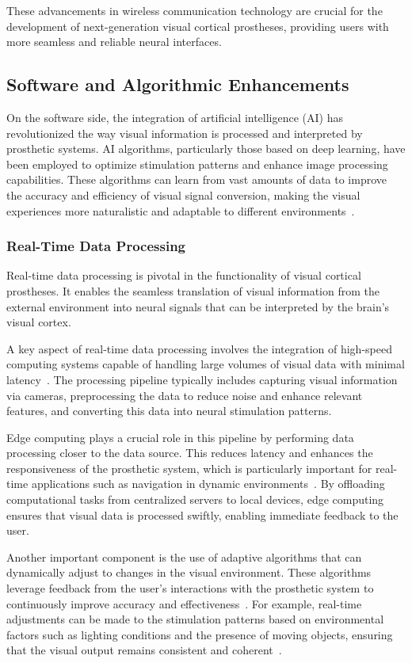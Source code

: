 \documentclass[twocolumn,10pt]{article}
\begin{document}
These advancements in wireless communication technology are crucial for the
development of next-generation visual cortical prostheses, providing users with
more seamless and reliable neural interfaces.

\subsection{Software and Algorithmic Enhancements}
On the software side, the integration of artificial intelligence (AI) has
revolutionized the way visual information is processed and interpreted by
prosthetic systems. AI algorithms, particularly those based on deep learning,
have been employed to optimize stimulation patterns and enhance image processing
capabilities. These algorithms can learn from vast amounts of data to improve
the accuracy and efficiency of visual signal conversion, making the visual
experiences more naturalistic and adaptable to different
environments~\parencite{romeniMachineLearningFramework2021}.

\subsubsection*{Real-Time Data Processing}
Real-time data processing is pivotal in the functionality of visual cortical
prostheses. It enables the seamless translation of visual information from the
external environment into neural signals that can be interpreted by the brain's
visual cortex.

A key aspect of real-time data processing involves the integration of high-speed
computing systems capable of handling large volumes of visual data with minimal
latency~\parencite{nurmikkoChallengesLargeScaleCortical2020}. The processing
pipeline typically includes capturing visual information via cameras,
preprocessing the data to reduce noise and enhance relevant features, and
converting this data into neural stimulation patterns.

Edge computing plays a crucial role in this pipeline by performing data
processing closer to the data source. This reduces latency and enhances the
responsiveness of the prosthetic system, which is particularly important for
real-time applications such as navigation in dynamic
environments~\parencite{wangDeepLearningEdge2020}. By offloading computational
tasks from centralized servers to local devices, edge computing ensures that
visual data is processed swiftly, enabling immediate feedback to the user.

Another important component is the use of adaptive algorithms that can
dynamically adjust to changes in the visual environment. These algorithms
leverage feedback from the user's interactions with the prosthetic system to
continuously improve accuracy and
effectiveness~\parencite{pio-lopezVisualCorticalProsthesis2021b}. For example,
real-time adjustments can be made to the stimulation patterns based on
environmental factors such as lighting conditions and the presence of moving
objects, ensuring that the visual output remains consistent and
coherent~\parencite{fylstraHumanprosthesisCooperationCombining2022}.
\end{document}
